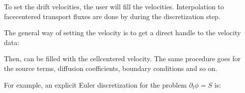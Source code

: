 \documentclass[letterpaper,10pt,english]{sphinxmanual}
\begin{document}
\begin{sphinxVerbatim}[commandchars=\\\{\},formatcom=\scriptsize]
                                
                             
               
   
                               
                           
\end{sphinxVerbatim}

To set the drift velocities, the user will fill the  velocities.
Interpolation to face\sphinxhyphen{}centered transport fluxes are done by  during the discretization step.

The general way of setting the velocity is to get a direct handle to the velocity data:

\begin{sphinxVerbatim}[commandchars=\\\{\},formatcom=\scriptsize]
 

   
\end{sphinxVerbatim}

Then,  can be filled with the cell\sphinxhyphen{}centered velocity.
The same procedure goes for the source terms, diffusion coefficients, boundary conditions and so on.

For example, an explicit Euler discretization for the problem \(\partial_t\phi = S\) is:
\end{document}
